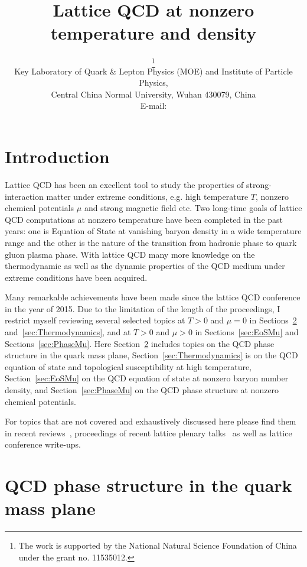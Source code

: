 \documentclass{PoS}
\title{Lattice QCD at nonzero temperature and density}
\author{\speaker{Heng-Tong Ding}\thanks{The work is supported by the National Natural Science Foundation of China under the grant no. 11535012.}\\
        Key Laboratory of Quark \& Lepton Physics (MOE) and Institute of
Particle Physics, \\
Central China Normal University, Wuhan 430079, China\\
        E-mail: \email{hengtong.ding@mail.ccnu.edu.cn}}
\begin{document}
\section{Introduction}


Lattice QCD has been an excellent tool to study the properties of strong-interaction matter under extreme conditions, e.g. high temperature $T$, nonzero chemical potentials $\mu$ and
strong magnetic field etc. Two long-time goals of lattice QCD computations at nonzero temperature have been completed in the past years: one is Equation of State at vanishing baryon density in a wide temperature range and the other is the nature of the transition from hadronic phase to quark gluon plasma phase. With lattice QCD many more knowledge on the thermodynamic as well as the dynamic properties of the QCD medium under extreme conditions have been acquired. 

Many remarkable achievements have been made since the lattice QCD conference in the year of 2015. Due to the limitation of the length of the proceedings, I restrict myself reviewing several selected topics at $T>0$ and $\mu=0$ in Sections~\ref{sec:Phase} and~\ref{sec:Thermodynamics}, and at $T>0$ and $\mu>0$ in Sections~\ref{sec:EoSMu} and Sections~\ref{sec:PhaseMu}. 
Here Section~\ref{sec:Phase} includes topics on the QCD phase structure in the quark mass plane, Section~\ref{sec:Thermodynamics} is on the QCD equation of state and topological susceptibility at high temperature,
Section~\ref{sec:EoSMu} on the QCD equation of state at nonzero baryon number density, and Section~\ref{sec:PhaseMu} on the QCD phase structure at nonzero chemical potentials.


 For topics that are not covered and exhaustively discussed here please find them in recent reviews~\cite{Ding:2015ona,Meyer:2011gj,Schmidt:2017bjt}, proceedings of  recent lattice plenary talks~\cite{Sexty:2014dxa,Meyer:2015wax,Borsanyi:2015axp,Bazavov:2015qsa,DElia:2015rwa,Scorzato:2015qts} as well as lattice conference write-ups.
 

\section{QCD phase structure in the quark mass plane}
\label{sec:Phase}
\end{document}
